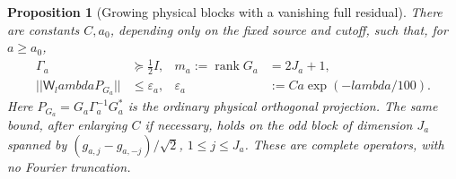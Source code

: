 \documentclass[11pt]{article}
\def\lambda{lambda}%
\def\norm#1{||#1||}%
\newtheorem{proposition}[theorem]{Proposition}
\theoremstyle{remark}
\newcommand{\norm}[1]{\left\lVert #1\right\rVert}
\begin{document}
\begin{proposition}[Growing physical blocks with a vanishing full residual]
\label{prop:v135-growing-radical}
There are constants $C,a_0$, depending only on the fixed source and
cutoff, such that, for $a\ge a_0$,
\begin{align}
 \Gamma_a&\succeq\tfrac12 I,
       &m_a:=\operatorname{rank}G_a&=2J_a+1,\label{eq:v135-gram}\\
 \norm{\mathsf W_\lambda P_{G_a}}
       &\le\varepsilon_a,
       &\varepsilon_a&:=Ca\exp(-\lambda/100).
       \label{eq:v135-block-residual}
\end{align}
Here $P_{G_a}=G_a\Gamma_a^{-1}G_a^*$ is the ordinary physical
orthogonal projection.  The same bound, after enlarging $C$ if
necessary, holds on the odd block of dimension $J_a$ spanned by
$(g_{a,j}-g_{a,-j})/\sqrt2$, $1\le j\le J_a$.
These are complete operators, with no Fourier truncation.
\end{proposition}
\end{document}
